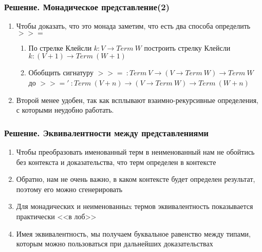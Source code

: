 \documentclass{beamer}
\begin{document}
\begin{frame}[fragile=singleslide]\frametitle{Решение. Монадическое представление(2)}
    \begin{enumerate}
        \item Чтобы доказать, что это монада заметим, что есть два способа определить $>>=$
          \begin{enumerate}
            \item По стрелке Клейсли $k : V \to Term\ W$ построить стрелку Клейсли $k : (V + 1) \to Term\ (W + 1)$
            \item Обобщить сигнатуру $>>=\ : Term\ V \to (V \to Term\ W) \to Term\ W$ до $>>='\ : Term\ (V + n) \to (V \to Term\ W) \to Term\ (W + n)$
          \end{enumerate}
        \item Второй менее удобен, так как всплывают взаимно-рекурсивные определения, с которыми неудобно работать.
    \end{enumerate}
\end{frame}


\begin{frame}[fragile=singleslide]\frametitle{Решение. Эквивалентности между представлениями}
    \begin{enumerate}
        \item Чтобы преобразовать именованный терм в неименованный нам не обойтись без контекста и доказательства, что терм определен в контексте
        \item Обратно, нам не очень важно, в каком контексте будет определен результат, поэтому его можно сгенерировать
        \item Для монадических и неименованныx термов эквивалентность показывается практически <<в лоб>>
        \item Имея эквивалентность, мы получаем буквальное равенство между типами, которым можно пользоваться при дальнейших доказательствах
    \end{enumerate}
\end{frame}
\end{document}
